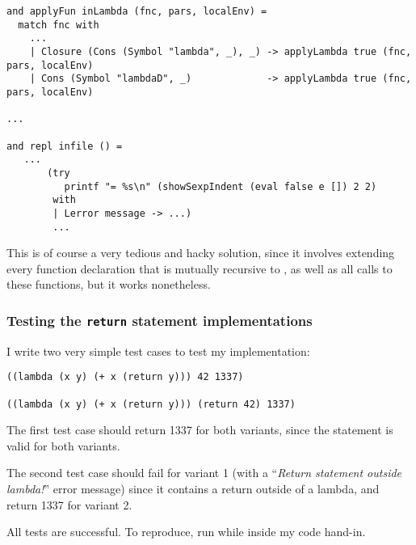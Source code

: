 \begin{verbatim}
and applyFun inLambda (fnc, pars, localEnv) =
  match fnc with
    ...
    | Closure (Cons (Symbol "lambda", _), _) -> applyLambda true (fnc, pars, localEnv)
    | Cons (Symbol "lambdaD", _)             -> applyLambda true (fnc, pars, localEnv)

...

and repl infile () =
   ...
       (try
          printf "= %s\n" (showSexpIndent (eval false e []) 2 2)
        with 
        | Lerror message -> ...)
        ...
\end{verbatim}

This is of course a very tedious and hacky solution, since it involves extending
every function declaration that is mutually recursive to , as well
as all calls to these functions, but it works nonetheless.

\newpage

\subsubsection{Testing the \texttt{return} statement implementations}

I write two very simple test cases to test my implementation:

\begin{verbatim}
((lambda (x y) (+ x (return y))) 42 1337)

((lambda (x y) (+ x (return y))) (return 42) 1337)
\end{verbatim}

The first test case should return 1337 for both variants, since the 
statement is valid for both variants.

\smallskip

The second test case should fail for variant 1 (with a ``\emph{Return statement
outside lambda!}'' error message) since it contains a return outside of a
lambda, and return 1337 for variant 2.

\medskip

All tests are successful. To reproduce, run  while inside my code
hand-in.

\Sectend
